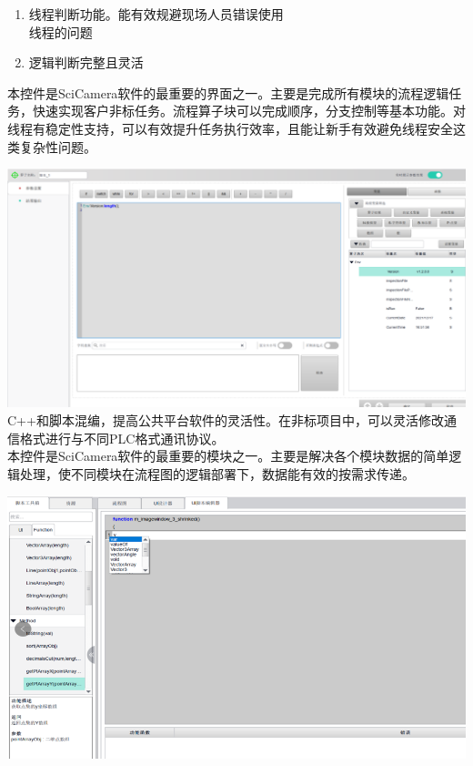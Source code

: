 \documentclass[lighthipster]{simplehipstercv}
\begin{document}
\begin{minipage}[t]{\textwidth}
\begin{minipage}[t]{0.5\textwidth}
\begin{flushleft}
				\begin{enumerate}
					\item 线程判断功能。能有效规避现场人员错误使用\\线程的问题
					\item 逻辑判断完整且灵活
				\end{enumerate}
				本控件是SciCamera软件的最重要的界面之一。主要是完成所有模块的流程逻辑任务，快速实现客户非标任务。流程算子块可以完成顺序，分支控制等基本功能。对线程有稳定性支持，可以有效提升任务执行效率，且能让新手有效避免线程安全这类复杂性问题。
			\end{flushleft}
		\end{minipage}
		
		\vfill
		\vspace{2em}
		
		\begin{minipage}[t]{0.5\textwidth}
		\begin{flushleft}
			\includegraphics[width=0.8\linewidth]{PrjOPT_3.png} 
			\vfill
			\vspace{2em}
			C++和脚本混编，提高公共平台软件的灵活性。在非标项目中，可以灵活修改通信格式进行与不同PLC格式通讯协议。
			\\本控件是SciCamera软件的最重要的模块之一。主要是解决各个模块数据的简单逻辑处理，使不同模块在流程图的逻辑部署下，数据能有效的按需求传递。
		\end{flushleft}
		\end{minipage}
		\hspace*{1.6em}
		\begin{minipage}[t]{0.5\textwidth}
		\begin{flushleft}
			\includegraphics[width=0.8\linewidth]{PrjOPT_4.png}

\end{flushleft}
\end{minipage}
\end{minipage}
\end{document}
